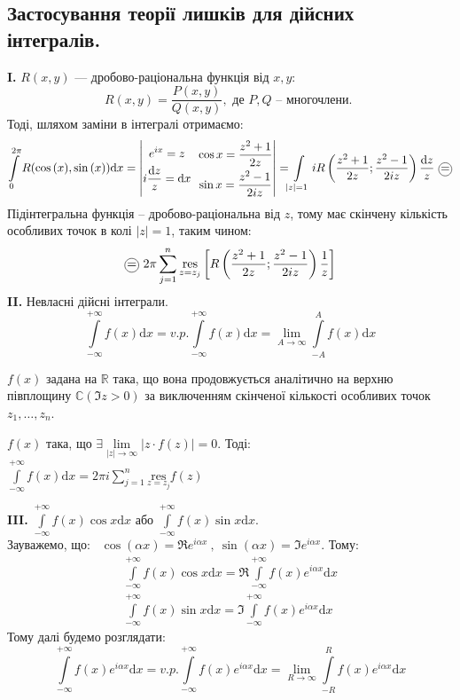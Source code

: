 \documentclass[a4paper]{scrartcl}
\theoremstyle{definition}
\theoremstyle{remark}
\theoremstyle{definition}
\theoremstyle{definition}
\newcommand*\circled[1]{\tikz[baseline=(char.base)]{
  \node[shape=circle,draw,inner sep=1pt] (char) {#1};}}
\def\i{\infty}                 %
\def\res#1{\underset{#1}{\mathrm{res}}}
\begin{document}
\subsection{ Застосування теорії лишків для дійсних інтегралів.}

\textbf{I.} $R(x,y)$ --- дробово-раціональна функція від $x,y$:
$$
R(x,y) = \frac{P(x,y)}{Q(x,y)} , \text{ де } P,Q \text{ -- многочлени. }
$$
Тоді, шляхом заміни в інтегралі отримаємо:
$$
 \int\limits_{0}^{2 \pi}{ R(\cos{(x)}, \sin{(x)}) \mathrm{d} x} = \left| \begin{gathered}
  e^{ix} = z\\
  i  \frac{\mathrm{d} z}{z}  = \mathrm{d} x
 \end{gathered} \ \  \begin{gathered}
   \cos{x}  = \frac{z^2 + 1}{2 z} \\
   \sin{x} = \frac{z^2 - 1}{2iz}
 \end{gathered} \right|=\!\!  \int\limits_{|z| = 1}^{ }{ i R \left( \frac{z^2 + 1}{2 z} ; \frac{z^2 - 1}{2iz}   \right) \frac{\mathrm{d} z}{z} } \ \circled{=}
$$
Підінтегральна функція -- дробово-раціональна від $z$, тому має скінчену кількість особливих точок в колі $|z| = 1$, таким чином:
$$
\circled{=}\   2\pi  \sum\limits_{j = 1}^{ n} { \res{z= z_j} \left[R \left( \frac{z^2 + 1}{2 z} ; \frac{z^2 - 1}{2iz}   \right) \frac{1}{z}  \right]}
$$
\textbf{II.} Невласні дійсні інтеграли.
$$
 \int\limits_{- \infty}^{ +\infty}{ f(x) \mathrm{d} x} = v.p.  \int\limits_{-\infty}^{ +\infty}{ f(x) \mathrm{d} x } =  \lim\limits_{A\to  \infty}{ \int\limits_{-A}^{A}{f(x) \mathrm{d} x}}
$$

\begin{boxteo}
 $f(x)$ задана на $\mathbb{R}$ така, що вона продовжується аналітично на верхню півплощину $\mathbb{C} (\Im z > 0)$ за виключенням
 скінченої кількості особливих точок $z_1 , \dots , z_n$.\par
 $f(x)$ така, що $\exists  \lim\limits_{|z|\to  \infty}{ \left| z \cdot f(z) \right| } = 0$. Тоді: \
 $
\displaystyle  \int\limits_{-\infty}^{ +\infty}{ f(x) \mathrm{d} x } = 2 \pi i  \sum\limits_{j =1 }^{n}{\res{z = z_j} f(z)}
 $
\end{boxteo}


\textbf{III.} $\displaystyle   \int\limits_{-\i}^{ +\infty}{f(x) \cos{x} \mathrm{d} x}$ або $\displaystyle   \int\limits_{-\i}^{ +\infty}{f(x) \sin{x} \mathrm{d} x}$.\\

Зауважемо, що: \ $
  \cos{(\alpha x)} = \Re e^{i \alpha x}\ , \
  \sin{(\alpha x)} = \Im e^{i \alpha x}
$. Тому:
$$
\begin{gathered}
\int\limits_{-\i}^{ +\infty}{f(x) \cos{x} \mathrm{d} x} =\Re  \int\limits_{-\i}^{ +\infty}{f(x) e^{i \alpha x} \mathrm{d} x} \\
\int\limits_{-\i}^{ +\infty}{f(x) \sin{x} \mathrm{d} x} =\Im  \int\limits_{-\i}^{ +\infty}{f(x) e^{i \alpha x} \mathrm{d} x}
\end{gathered}
$$
Тому далі будемо розглядати:
$$
 \int\limits_{-\i}^{ +\infty}{f(x) e^{i \alpha x} \mathrm{d} x} = v.p.  \int\limits_{-\i}^{ +\infty}{f(x) e^{i \alpha x} \mathrm{d} x} = \lim\limits_{R \to  \infty}{
 \int\limits_{-R}^{ R}{f(x) e^{i \alpha x} \mathrm{d} x}
 }
$$
\end{document}
